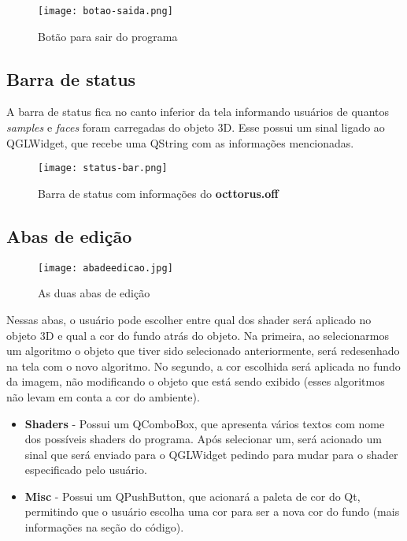 \begin{figure}[H]
    \centering
    \texttt{[image: botao-saida.png]}
    \caption{Botão para sair do programa}
\end{figure}

\subsection{Barra de status}

A barra de status fica no canto inferior da tela 
informando usuários de quantos \emph{samples} e \emph{faces} foram carregadas 
do objeto 3D.
Esse possui um sinal ligado ao QGLWidget, que recebe 
uma QString com as informações mencionadas.

\begin{figure}[H]
    \centering
    \texttt{[image: status-bar.png]}
    \caption{Barra de status com informações do \textbf{octtorus.off}}
\end{figure}

\newpage

\subsection{Abas de edição}

\begin{figure}[H]
    \centering
    \texttt{[image: abadeedicao.jpg]}
    \caption{As duas abas de edição}
\end{figure}

Nessas abas, o usuário pode escolher entre qual dos shader será aplicado no objeto 3D
e qual a cor do fundo atrás do objeto. Na primeira, ao selecionarmos um algoritmo
o objeto que tiver sido selecionado anteriormente, será redesenhado na tela com o novo
algoritmo. No segundo, a cor escolhida será aplicada no fundo da imagem, não modificando
o objeto que está sendo exibido (esses algoritmos não levam em conta a cor do ambiente). 

\begin{itemize}
    \item \textbf{Shaders} - Possui um QComboBox, que apresenta 
    vários textos com nome dos possíveis shaders do 
    programa. Após selecionar um, será acionado um sinal 
    que será enviado para o QGLWidget pedindo para mudar 
    para o shader especificado pelo usuário.
    \item \textbf{Misc} - Possui um QPushButton, que acionará a 
    paleta de cor do Qt, permitindo que o usuário escolha 
    uma cor para ser a nova cor do fundo (mais informações 
    na seção do código).
\end{itemize}